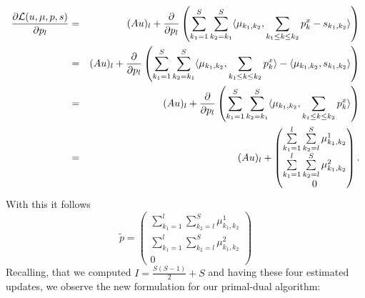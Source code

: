 \documentclass{scrreprt}
\begin{document}
            \begin{eqnarray}
                \frac{\partial \mathcal{L}(u, \mu, p, s)}{\partial p_{l}} &=& (Au)_{l} + \frac{\partial}{\partial p_{l}} \left(\sum_{k_{1} = 1}^{S} \sum_{k_{2} = k_{1}}^{S} \langle \mu_{k_{1}, k_{2}}, \sum_{k_{1} \le k \le k_{2}} p^{x}_{k} - s_{k_{1}, k_{2}} \rangle \right) \notag \\
                &=& (Au)_{l} + \frac{\partial}{\partial p_{l}} \left(\sum_{k_{1} = 1}^{S} \sum_{k_{2} = k_{1}}^{S} \langle \mu_{k_{1}, k_{2}}, \sum_{k_{1} \le k \le k_{2}} p^{x}_{k} \rangle - \langle \mu_{k_{1}, k_{2}}, s_{k_{1}, k_{2}} \rangle \right) \notag \\
                &=& (Au)_{l} + \frac{\partial}{\partial p_{l}} \left(\sum_{k_{1} = 1}^{S} \sum_{k_{2} = k_{1}}^{S} \langle \mu_{k_{1}, k_{2}}, \sum_{k_{1} \le k \le k_{2}} p^{x}_{k} \rangle \right) \notag \\
                &=& (Au)_{l} + 
                    \begin{pmatrix}
                        \sum\limits_{k_{1} = 1}^{l} \sum\limits_{k_{2} = l}^{S} \mu_{k_{1}, k_{2}}^{1} \\
                        \sum\limits_{k_{1} = 1}^{l} \sum\limits_{k_{2} = l}^{S} \mu_{k_{1}, k_{2}}^{2} \\
                        0
                    \end{pmatrix}.\notag
            \end{eqnarray}
        With this it follows
            $$
                \tilde{p} =
                    \begin{pmatrix}
                        \sum\limits_{k_{1} = 1}^{l} \sum\limits_{k_{2} = l}^{S} \mu_{k_{1}, k_{2}}^{1} \\
                        \sum\limits_{k_{1} = 1}^{l} \sum\limits_{k_{2} = l}^{S} \mu_{k_{1}, k_{2}}^{2} \\
                        0
                    \end{pmatrix}
            $$
        Recalling, that we computed $I = \frac{S(S-1)}{2} + S$ and having these four estimated updates, we observe the new formulation for our primal-dual algorithm:
\end{document}
